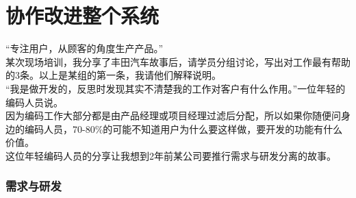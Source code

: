 \chapter{协作改进整个系统} %

``专注用户，从顾客的角度生产产品。''\\
某次现场培训，我分享了丰田汽车故事后，请学员分组讨论，写出对工作最有帮助的3条。以上是某组的第一条，我请他们解释说明。\\
``我是做开发的，反思时发现其实不清楚我的工作对客户有什么作用。''一位年轻的编码人员说。\\
因为编码工作大部分都是由产品经理或项目经理过滤后分配，所以如果你随便问身边的编码人员，70-80\%的可能不知道用户为什么要这样做，要开发的功能有什么价值。\\
这位年轻编码人员的分享让我想到2年前某公司要推行需求与研发分离的故事。

\hypertarget{ux9700ux6c42ux4e0eux7814ux53d1}{%
\subsection{需求与研发}\label{ux9700ux6c42ux4e0eux7814ux53d1}}

